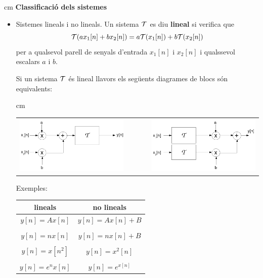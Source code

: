 \documentclass{article}
\begin{document}
 cm
\noindent
\textbf{Classificaci\'o dels sistemes}
\begin{itemize}

\item Sistemes lineals i no lineals.
Un sistema ${\cal T}$ es diu \textbf{lineal} si verifica que
\[
{\cal T}(ax_1[n]+bx_2[n])=a {\cal T}(x_1[n]) + b {\cal T}(x_2[n])
\]
\noindent
per a qualsevol parell de senyals d'entrada $x_1[n]$ i $x_2[n]$ i qualssevol
escalars $a$ i $b$.

\noindent
Si un sistema ${\cal T}$  \'es lineal llavors els seg\"uents diagrames de blocs 
s\'on equivalents:

 cm
\begin{center}
\begin{tabular}{ccc}
\begin{minipage}{6cm}\includegraphics[width=6cm]{lineal1.png}\end{minipage}
 & $\qquad$ &
\begin{minipage}{6cm}\includegraphics[width=6cm]{lineal2.png}\end{minipage}
\end{tabular}
\end{center}


\noindent
Exemples:
\begin{center}
\begin{tabular}{|c|c|}
 lineals & no lineals \\ \hline
$y[n]=Ax[n]$ & $y[n]=Ax[n]+B$ \\ & \\
$y[n]=nx[n]$ & $y[n]=nx[n]+B$ \\ & \\
$y[n]=x[n^2]$  & $y[n]=x^2[n]$ \\ & \\
$y[n]=e^n x[n]$ & $y[n]=e^{x[n]}$
\end{tabular}
\end{center}


\end{itemize}
\end{document}

